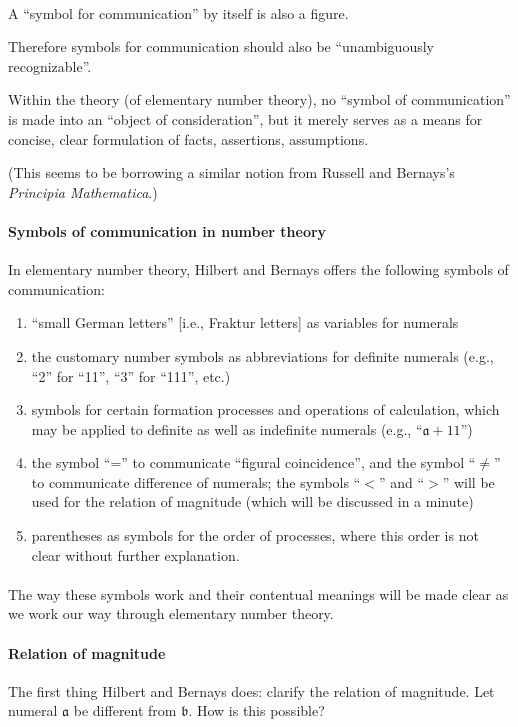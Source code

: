 \paragraph{} %
A ``symbol for communication'' by itself is also a figure.

Therefore symbols for communication should also be
``unambiguously recognizable''.

Within the theory (of elementary number theory), no ``symbol of communication''
is made into an ``object of consideration'', but it merely serves as a
means for concise, clear formulation of facts, assertions,
assumptions.

(This seems to be borrowing a similar notion from Russell and
Bernays's \textit{Principia Mathematica}.)

\paragraph{Symbols of communication in number theory} %
In elementary number theory, Hilbert and Bernays offers the following
symbols of communication:
\begin{enumerate}
\item ``small German letters'' [i.e., Fraktur letters] as variables
  for numerals
\item the customary number symbols as abbreviations for definite
  numerals (e.g., ``2'' for ``11'', ``3'' for ``111'', etc.)
\item symbols for certain formation processes and operations of
  calculation, which may be applied to definite as well as indefinite
  numerals (e.g., ``$\mathfrak{a}+11$'')
\item the symbol ``='' to communicate ``figural coincidence'', and the
  symbol ``$\neq$'' to communicate difference of numerals; the symbols
  ``$<$'' and ``$>$'' will be used for the relation of magnitude
  (which will be discussed in a minute)
\item parentheses as symbols for the order of processes, where this
  order is not clear without further explanation.
\end{enumerate}

\paragraph{} %
The way these symbols work and their contentual meanings will be made
clear as we work our way through elementary number theory.

\paragraph{Relation of magnitude} %
The first thing Hilbert and Bernays does: clarify the relation of
magnitude. Let numeral $\mathfrak{a}$ be different from
$\mathfrak{b}$. How is this possible?


